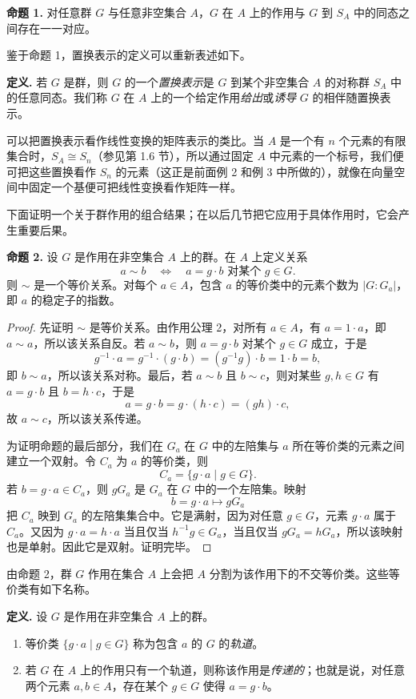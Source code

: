 \medskip
\noindent\textbf{命题 1.} 对任意群 $G$ 与任意非空集合 $A$，$G$ 在 $A$ 上的作用与 $G$ 到 $S_A$ 中的同态之间存在一一对应。

鉴于命题 1，置换表示的定义可以重新表述如下。

\noindent\textbf{定义.} 若 $G$ 是群，则 $G$ 的一个\emph{置换表示}是 $G$ 到某个非空集合 $A$ 的对称群 $S_A$ 中的任意同态。我们称 $G$ 在 $A$ 上的一个给定作用\emph{给出}或\emph{诱导} $G$ 的相伴随置换表示。

可以把置换表示看作线性变换的矩阵表示的类比。当 $A$ 是一个有 $n$ 个元素的有限集合时，$S_A\cong S_n$（参见第 1.6 节），所以通过固定 $A$ 中元素的一个标号，我们便可把这些置换看作 $S_n$ 的元素（这正是前面例 2 和例 3 中所做的），就像在向量空间中固定一个基便可把线性变换看作矩阵一样。

下面证明一个关于群作用的组合结果；在以后几节把它应用于具体作用时，它会产生重要后果。

\medskip
\noindent\textbf{命题 2.} 设 $G$ 是作用在非空集合 $A$ 上的群。在 $A$ 上定义关系
\[
  a\sim b \quad\Longleftrightarrow\quad a=g\cdot b\text{ 对某个 }g\in G.
\]
则 $\sim$ 是一个等价关系。对每个 $a\in A$，包含 $a$ 的等价类中的元素个数为 $|G:G_a|$，即 $a$ 的稳定子的指数。

\begin{proof}
先证明 $\sim$ 是等价关系。由作用公理 2，对所有 $a\in A$，有 $a=1\cdot a$，即 $a\sim a$，所以该关系自反。若 $a\sim b$，则 $a=g\cdot b$ 对某个 $g\in G$ 成立，于是
\[
  g^{-1}\cdot a=g^{-1}\cdot(g\cdot b)=(g^{-1}g)\cdot b=1\cdot b=b,
\]
即 $b\sim a$，所以该关系对称。最后，若 $a\sim b$ 且 $b\sim c$，则对某些 $g,h\in G$ 有 $a=g\cdot b$ 且 $b=h\cdot c$，于是
\[
  a=g\cdot b=g\cdot(h\cdot c)=(gh)\cdot c,
\]
故 $a\sim c$，所以该关系传递。

为证明命题的最后部分，我们在 $G_a$ 在 $G$ 中的左陪集与 $a$ 所在等价类的元素之间建立一个双射。令 $C_a$ 为 $a$ 的等价类，则
\[
  C_a=\{g\cdot a\mid g\in G\}.
\]
若 $b=g\cdot a\in C_a$，则 $gG_a$ 是 $G_a$ 在 $G$ 中的一个左陪集。映射
\[
  b=g\cdot a\longmapsto gG_a
\]
把 $C_a$ 映到 $G_a$ 的左陪集集合中。它是满射，因为对任意 $g\in G$，元素 $g\cdot a$ 属于 $C_a$。又因为 $g\cdot a=h\cdot a$ 当且仅当 $h^{-1}g\in G_a$，当且仅当 $gG_a=hG_a$，所以该映射也是单射。因此它是双射。证明完毕。
\end{proof}

由命题 2，群 $G$ 作用在集合 $A$ 上会把 $A$ 分割为该作用下的不交等价类。这些等价类有如下名称。

\noindent\textbf{定义.} 设 $G$ 是作用在非空集合 $A$ 上的群。
\begin{enumerate}[label=(\arabic*)]
  \item 等价类 $\{g\cdot a\mid g\in G\}$ 称为包含 $a$ 的 $G$ 的\emph{轨道}。
  \item 若 $G$ 在 $A$ 上的作用只有一个轨道，则称该作用是\emph{传递的}；也就是说，对任意两个元素 $a,b\in A$，存在某个 $g\in G$ 使得 $a=g\cdot b$。
\end{enumerate}

